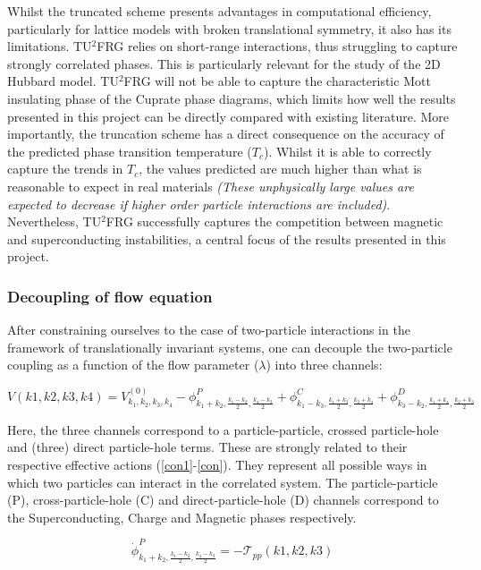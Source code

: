 \documentclass[11pt]{article}
\begin{document}
\noindent Whilst the truncated scheme presents advantages in computational efficiency, particularly for lattice models with broken translational symmetry, it also has its limitations. 
TU$^2$FRG relies on short-range interactions, thus struggling to capture strongly correlated phases. 
This is particularly relevant for the study of the 2D Hubbard model. TU$^2$FRG will not be able to capture
the characteristic Mott insulating phase of the Cuprate phase diagrams\cite{imada1998metal}, which limits how well the results presented in this project can be directly compared with existing literature. 
More importantly, the truncation scheme has a direct consequence on the accuracy of the predicted phase transition temperature ($T_c$). Whilst it is able to correctly capture
the trends in $T_c$, the values predicted are much higher than what is reasonable to expect in real materials \textit{(These unphysically large values are expected to decrease if higher order particle interactions are included)}.
Nevertheless, TU$^2$FRG successfully captures the competition between magnetic and superconducting instabilities, a central focus of the results presented in this project. 
\subsubsection{Decoupling of flow equation}
After constraining ourselves to the case of two-particle interactions in the framework of translationally invariant systems, one can decouple the two-particle coupling as a function of the flow parameter ($\lambda$) into three channels:

\begin{equation} \label{V decoupling}
    V(k1,k2,k3,k4)= V_{k_1, k_2, k_3, k_4}^{(0)} - \phi^{P}_{k_1 +k_2, \frac{k_1 - k_2}{2}, \frac{k_4-k_3}{2}} + \phi^{C}_{k_1 - k_3, \frac{k_1 +k_3}{2}, \frac{k_2+k_4}{2}} +\phi^{D}_{k_3- k_2, \frac{k_1 + k_4}{2}, \frac{k_2+k_3}{2}}
\end{equation}

\noindent Here, the three channels correspond to a particle-particle, crossed particle-hole and (three) direct particle-hole terms. These are strongly related to their respective effective actions (\ref{con1}-\ref{con}). They represent all possible ways in which two particles can interact in the correlated system. The particle-particle (P), cross-particle-hole (C) and direct-particle-hole (D) channels
correspond to the Superconducting, Charge and Magnetic phases respectively. 

\begin{equation}\label{con1}
    \dot{\phi}^{P}_{k_1 +k_2, \frac{k_1 - k_2}{2}, \frac{k_4-k_3}{2}} = - \mathcal{T}_{pp}(k1,k2,k3)
\end{equation}
\end{document}
